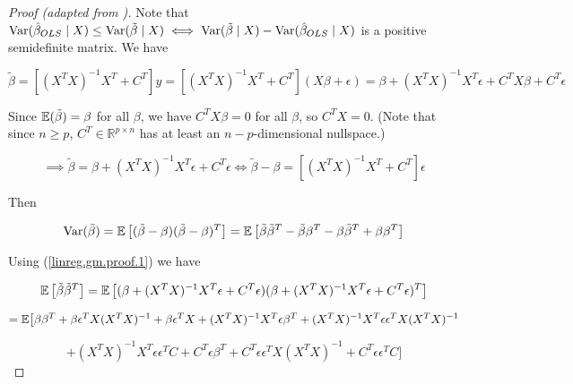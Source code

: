 \begin{proof}[Proof (adapted from \citet{pesaran-2015-text})]

Note that \(\Var (\hat{\beta}_{OLS} \mid X) \leq \Var(\tilde{\beta} \mid X) \iff \Var(\tilde{\beta} \mid X) - \Var(\hat{\beta}_{OLS} \mid X)\) is a positive semidefinite matrix. We have

\[
\tilde{\beta} = [(X^TX)^{-1} X^T + C^T]y = [(X^TX)^{-1} X^T + C^T](X \beta + \epsilon) = \beta + (X^TX)^{-1} X^T \epsilon + C^TX \beta + C^T\epsilon
\]

Since \(\E(\tilde{\beta}) = \beta\) for all \(\beta\), we have \( C^TX \beta = 0\) for all \(\beta\), so \(C^TX = 0\). (Note that since \(n \geq p\), \(C^T \in \mathbb{R}^{p \times n}\) has at least an \(n - p\)-dimensional nullspace.)


\begin{equation}\label{linreg.gm.proof.1}
 \implies\tilde{\beta} =   \beta + (X^TX)^{-1} X^T \epsilon  + C^T\epsilon   \iff \tilde{\beta} - \beta  =  [ (X^TX)^{-1}X^T + C^T]\epsilon
 \end{equation}

Then

\begin{equation}\label{linreg.gm.proof.4}
\Var(\tilde{\beta}) = \E \left[ ( \tilde{\beta} - \beta)(\tilde{\beta} - \beta)^T \right] = \E\left[ \tilde{\beta}  \tilde{\beta}^T - \tilde{\beta} \beta^T  - \beta \tilde{\beta}^T + \beta \beta^T \right]
\end{equation}


Using (\ref{linreg.gm.proof.1}) we have

\[
\E \left[ \tilde{\beta} \tilde{\beta}^T \right] = \E \left[ ( \beta + (X^TX)^{-1} X^T \epsilon  + C^T\epsilon) ( \beta + (X^TX)^{-1} X^T \epsilon  + C^T\epsilon)^T \right]
\]

\[
=  \E  \big[ \beta \beta^T + \beta \epsilon^T X  (X^TX)^{-1} + \beta \epsilon^T X  + (X^TX)^{-1} X^T \epsilon \beta^T + (X^TX)^{-1} X^T \epsilon\epsilon^T X  (X^TX)^{-1} 
\]

\[
 +  (X^TX)^{-1} X^T \epsilon \epsilon^T C  + C^T\epsilon \beta^T +  C^T\epsilon \epsilon^T X  (X^TX)^{-1}    + C^T\epsilon\epsilon^T C  \big]
\]


\end{proof}
